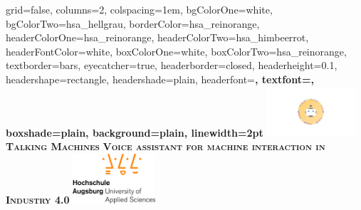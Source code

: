 \documentclass[portrait,final,a2paper,fontscale=0.87]{baposter}
\begin{document}



\begin{poster}%
  {
  grid=false,
  columns=2,
  colspacing=1em,
  bgColorOne=white,
  bgColorTwo=hsa_hellgrau,
  borderColor=hsa_reinorange,
  headerColorOne=hsa_reinorange,
  headerColorTwo=hsa_himbeerrot,
  headerFontColor=white,
  boxColorOne=white,
  boxColorTwo=hsa_reinorange,
  textborder=bars,
  eyecatcher=true,
  headerborder=closed,
  headerheight=0.1\textheight,
  headershape=rectangle,
  headershade=plain,
  headerfont=\Large\bf\sc, %
  textfont={\sf\setlength{\parindent}{1.5em}},
  boxshade=plain,
  background=plain,
  linewidth=2pt
  }
  {
	\includegraphics[height=5em]{images/talking_machines_logo.png}
  } 
  {\bf\textsc{Talking Machines}\vspace{0.5em}}
  {\bf\textsc{Voice assistant for machine interaction in Industry 4.0}\vspace{0.5em}}
  {%
    \includegraphics[height=5em]{images/hsa_logo_normal.jpg}
}
\end{poster}
\end{document}
